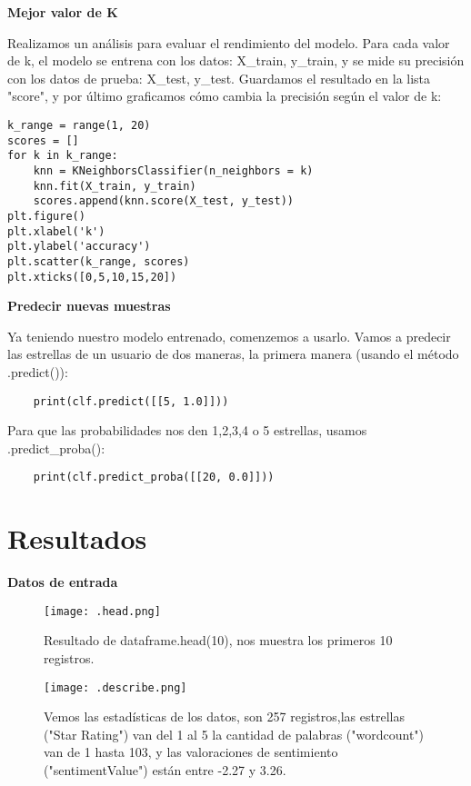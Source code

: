 \documentclass{article}
\begin{document}
\textbf{Mejor valor de K}




Realizamos un análisis para evaluar el rendimiento del modelo. Para cada valor de k, el modelo se entrena con los datos: X\_train, y\_train, y se mide su precisión con los datos de prueba: X\_test, y\_test. Guardamos el resultado en la lista "score", y por último graficamos cómo cambia la precisión según el valor de k:

\begin{lstlisting}
k_range = range(1, 20)
scores = []
for k in k_range:
    knn = KNeighborsClassifier(n_neighbors = k)
    knn.fit(X_train, y_train)
    scores.append(knn.score(X_test, y_test))
plt.figure()
plt.xlabel('k')
plt.ylabel('accuracy')
plt.scatter(k_range, scores)
plt.xticks([0,5,10,15,20])
\end{lstlisting}




\textbf{Predecir nuevas muestras}



Ya teniendo nuestro modelo entrenado, comenzemos a usarlo. Vamos a predecir las estrellas de un usuario de dos maneras, la primera manera (usando el método .predict()):
\begin{lstlisting}
    print(clf.predict([[5, 1.0]]))
\end{lstlisting}

Para que las probabilidades nos den 1,2,3,4 o 5 estrellas, usamos .predict\_proba(): 
\begin{lstlisting}
    print(clf.predict_proba([[20, 0.0]]))
\end{lstlisting}

\section{Resultados}

\textbf{Datos de entrada}


\begin{figure}[H]
    \centering
    \texttt{[image: .head.png]}
    \caption{{\small Resultado de dataframe.head(10), nos muestra los primeros 10 registros.}}
    \label{figura01}
\end{figure}

\begin{figure}[H]
    \centering
    \texttt{[image: .describe.png]}
    \caption{Vemos las estadísticas de los datos, son 257 registros,las estrellas ("Star Rating") van del 1 al 5 la cantidad de palabras ("wordcount") van de 1 hasta 103, y las valoraciones de sentimiento ("sentimentValue") están entre -2.27 y 3.26.}
    \label{figura02}
\end{figure}
\end{document}
